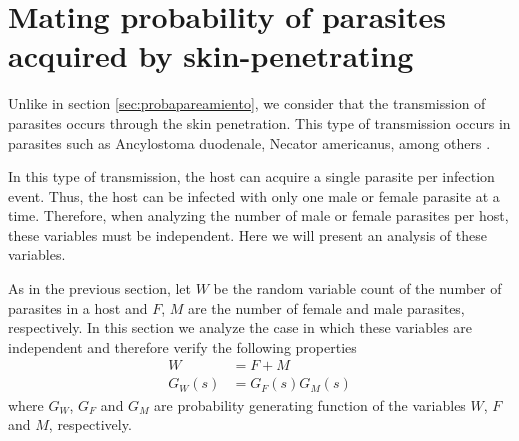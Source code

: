 \documentclass[12pt,a4paper]{article}
\theoremstyle{plain}%
\theoremstyle{definition}
\theoremstyle{remark}
\begin{document}


		
\section{Mating probability  of parasites acquired by skin-penetrating}%
\label{sec:disindep}

Unlike in section \ref{sec:probapareamiento}, we consider that the transmission of parasites occurs through the skin penetration. This type of transmission occurs in parasites such as Ancylostoma duodenale, Necator americanus, among others \cite{castelletto2014diverso,bryant2018critical}. 

In this type of transmission, the host can acquire a single parasite per infection event. Thus, the host can be infected with only one male or female parasite at a time. Therefore, when analyzing the number of male or female parasites per host, these variables must be independent. Here we will present an analysis of these variables.

	
	
	
	As in the previous section, let $W$ be the random variable count of the number of parasites in a host and $F$, $M$ are the number of female and male parasites, respectively. 
	In this section we analyze the case in which these variables are independent and therefore verify the following properties
	\begin{equation}\label{independencia}
	\begin{split}
	W&=F+M\\
	G_W(s)&=G_F(s)G_M(s)
	\end{split}
	\end{equation}
	where $G_W$, $G_F$ and $G_M$ are probability generating function of the variables $W$, $F$ and $M$, respectively.
	 
\end{document}
